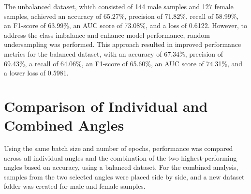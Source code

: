 \begin{table}[H]
	\centering
	\caption{Performance Metrics for Unbalanced vs. Balanced Datasets (Batch Size: 16, Epochs: 20)}
	\label{tab:unbalanced-balanced}
\end{table}

The unbalanced dataset, which consisted of 144 male samples and 127 female samples, achieved an accuracy of 65.27\%, precision of 71.82\%, recall of 58.99\%, an F1-score of 63.99\%, an AUC score of 73.08\%, and a loss of 0.6122. However, to address the class imbalance and enhance model performance, random undersampling was performed. This approach resulted in improved performance metrics for the balanced dataset, with an accuracy of 67.34\%, precision of 69.43\%, a recall of 64.06\%, an F1-score of 65.60\%, an AUC score of 74.31\%, and a lower loss of 0.5981.

\section{Comparison of Individual and Combined Angles}
Using the same batch size and number of epochs, performance was compared across all individual angles and the combination of the two highest-performing angles based on accuracy, using a balanced dataset. For the combined analysis, samples from the two selected angles were placed side by side, and a new dataset folder was created for male and female samples. 

